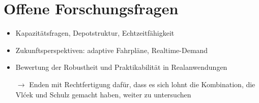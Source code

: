 \section{Offene Forschungsfragen}
\begin{itemize}
    \item Kapazitätsfragen, Depotstruktur, Echtzeitfähigkeit
    \item Zukunftsperspektiven: adaptive Fahrpläne, Realtime-Demand
    \item Bewertung der Robustheit und Praktikabilität in Realanwendungen
    
    $\rightarrow$ Enden mit Rechtfertigung dafür, dass es sich lohnt die Kombination, die Vlćek und Schulz gemacht haben, weiter zu untersuchen
\end{itemize}
